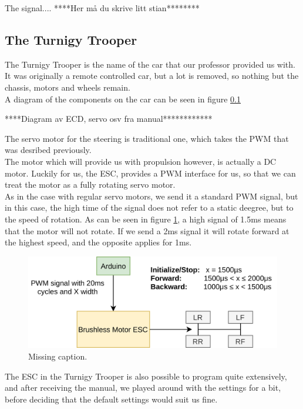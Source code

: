 \documentclass{article}
\begin{document}
The signal.... ****Her må du skrive litt stian********




\subsection{The Turnigy Trooper}
The Turnigy Trooper is the name of the car that our professor provided us with. It was originally a remote controlled car, but a lot is removed, so nothing but the chassis, motors and wheels remain.\\ 

A diagram of the components on the car can be seen in figure \ref{}

****Diagram av ECD, servo osv fra manual************


The servo motor for the steering is traditional one, which takes the PWM that was desribed previously.\\ 

The motor which will provide us with propulsion however, is actually a DC motor. Luckily for us, the ESC, provides a PWM interface for us, so that we can treat the motor as a fully rotating servo motor.\\ 

As in the case with regular servo motors, we send it a standard PWM signal, but in this case, the high time of the signal does not refer to a static deegree, but to the speed of rotation. As can be seen in figure \ref{esc}, a high signal of 1.5ms means that the motor will not rotate. If we send a 2ms signal it will rotate forward at the highest speed, and the opposite applies for 1ms. 

\begin{figure}[H]
	\centering
	\includegraphics[width=\linewidth]{brushless-motor-esc.png}
	\caption{Missing caption.}
	\label{esc}
\end{figure}


The ESC in the Turnigy Trooper is also possible to program quite extensively, and after receiving the manual, we played around with the settings for a bit, before deciding that the default settings would suit us fine. 
\end{document}
